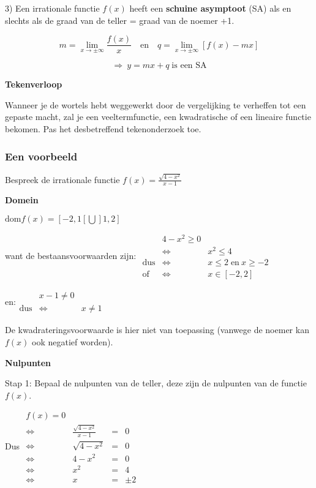 3) Een irrationale functie $f(x)$ heeft een \textbf{schuine asymptoot}
(SA) als en slechts als de graad van de teller = graad van de noemer
+1.

\[
{\displaystyle m={\displaystyle \lim_{x\to\pm\infty}}\frac{f(x)}{x}\quad\textrm{en}\quad q={\displaystyle \lim_{x\to\pm\infty}}\left[f(x)-mx\right]}
\]


\[
{\displaystyle \Rightarrow\:y=mx+q\;\textrm{is een SA}}
\]
\medskip{}


\noindent \textbf{Tekenverloop}

Wanneer je de wortels hebt weggewerkt door de vergelijking te verheffen
tot een gepaste macht, zal je een veeltermfunctie, een kwadratische
of een lineaire functie bekomen. Pas het desbetreffend tekenonderzoek
toe.


\subsubsection{Een voorbeeld}

Bespreek de irrationale functie ${\displaystyle f(x)=\frac{\sqrt{4-x^{2}}}{x-1}}$

\textbf{Domein}

${\displaystyle \textrm{dom}f(x)=[-2,1[\bigcup]1,2]}$

want de bestaansvoorwaarden zijn: ${\displaystyle \begin{array}{cclcc}
 & 4-x^{2}\geq0\\
 & \Longleftrightarrow & x^{2}\leq4\\
\textrm{dus} & \Longleftrightarrow & x\leq2\;\textrm{en}\:x\geq-2\\
\textrm{of} & \Longleftrightarrow & x\in[-2,2]
\end{array}}$

en:${\displaystyle \begin{array}{cclcc}
 & x-1\neq0\\
\textrm{dus} & \Longleftrightarrow & x\neq1
\end{array}}$

De kwadrateringsvoorwaarde is hier niet van toepassing (vanwege de
noemer kan $f(x)$ ook negatief worden).

\medskip{}


\textbf{Nulpunten}

Stap 1: Bepaal de nulpunten van de teller, deze zijn de nulpunten
van de functie $f(x)$.

Dus ${\displaystyle \begin{array}{ccclc}
f(x)=0\\
\Longleftrightarrow & \frac{\sqrt{4-x^{2}}}{x-1} & = & 0\\
\Longleftrightarrow & \sqrt{4-x^{2}} & = & 0\\
\Longleftrightarrow & 4-x^{2} & = & 0\\
\Longleftrightarrow & x^{2} & = & 4\\
\Longleftrightarrow & x & = & \pm2
\end{array}}$

